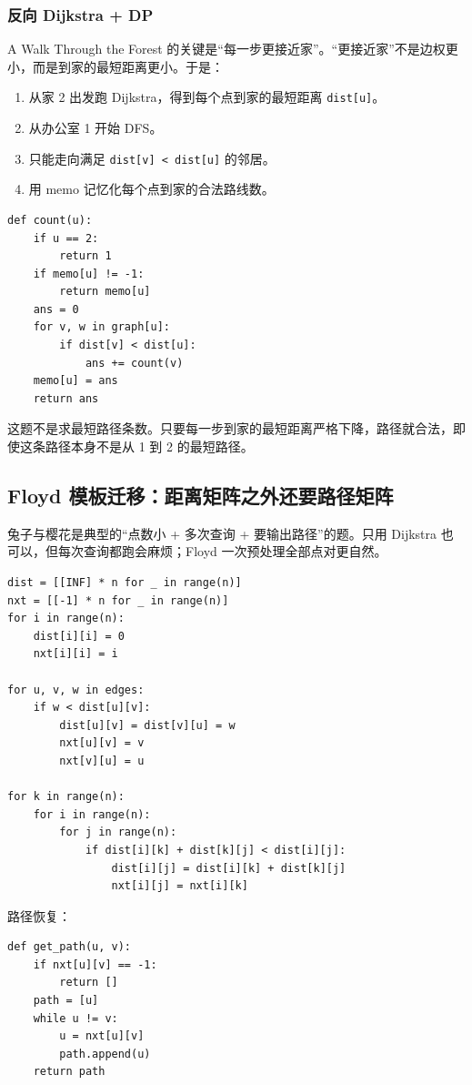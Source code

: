 \documentclass[10pt,a4paper,fontset=none]{ctexart}
\begin{document}
\subsubsection{反向 Dijkstra + DP}
A Walk Through the Forest 的关键是“每一步更接近家”。“更接近家”不是边权更小，而是到家的最短距离更小。于是：
\begin{enumerate}
  \item 从家 2 出发跑 Dijkstra，得到每个点到家的最短距离 \texttt{dist[u]}。
  \item 从办公室 1 开始 DFS。
  \item 只能走向满足 \texttt{dist[v] < dist[u]} 的邻居。
  \item 用 memo 记忆化每个点到家的合法路线数。
\end{enumerate}

\begin{lstlisting}[style=py]
def count(u):
    if u == 2:
        return 1
    if memo[u] != -1:
        return memo[u]
    ans = 0
    for v, w in graph[u]:
        if dist[v] < dist[u]:
            ans += count(v)
    memo[u] = ans
    return ans
\end{lstlisting}

\begin{warnbox}
这题不是求最短路径条数。只要每一步到家的最短距离严格下降，路径就合法，即使这条路径本身不是从 1 到 2 的最短路径。
\end{warnbox}

\subsection{Floyd 模板迁移：距离矩阵之外还要路径矩阵}
兔子与樱花是典型的“点数小 + 多次查询 + 要输出路径”的题。只用 Dijkstra 也可以，但每次查询都跑会麻烦；Floyd 一次预处理全部点对更自然。

\begin{lstlisting}[style=py]
dist = [[INF] * n for _ in range(n)]
nxt = [[-1] * n for _ in range(n)]
for i in range(n):
    dist[i][i] = 0
    nxt[i][i] = i

for u, v, w in edges:
    if w < dist[u][v]:
        dist[u][v] = dist[v][u] = w
        nxt[u][v] = v
        nxt[v][u] = u

for k in range(n):
    for i in range(n):
        for j in range(n):
            if dist[i][k] + dist[k][j] < dist[i][j]:
                dist[i][j] = dist[i][k] + dist[k][j]
                nxt[i][j] = nxt[i][k]
\end{lstlisting}

路径恢复：
\begin{lstlisting}[style=py]
def get_path(u, v):
    if nxt[u][v] == -1:
        return []
    path = [u]
    while u != v:
        u = nxt[u][v]
        path.append(u)
    return path
\end{lstlisting}
\end{document}
